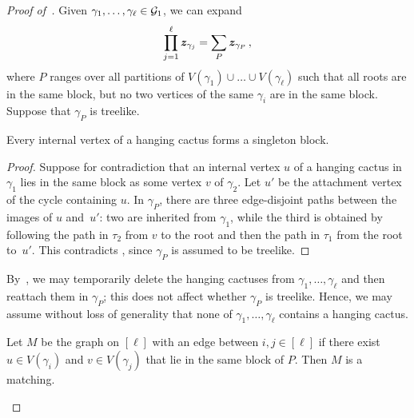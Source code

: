 \begin{proof}[Proof of~]
    Given $\gamma_1,\ldots,\gamma_\ell\in {\cal G}_1$,
    we can expand
    \[
        \prod_{j=1}^\ell {\bm z}_{\gamma_j} = \sum_P {\bm z}_{\gamma_P}\,,
    \]
    where $P$ ranges over all partitions of
    $V(\gamma_1)\cup \ldots \cup V(\gamma_\ell)$
    such that all roots are in the same block,
    but no two vertices of the same
    $\gamma_i$ are in the same block. Suppose that ${\gamma_P}$ is treelike.

    \begin{claim}\label{claim:hanging-own}
        Every internal vertex of a hanging cactus forms a singleton block.
    \end{claim}

    \begin{proof}
        Suppose for contradiction that an internal vertex $u$ of a hanging cactus in
        $\gamma_1$ lies in the same block as some vertex $v$ of $\gamma_2$. Let $u'$
        be the attachment vertex of the cycle containing $u$. In ${\gamma_P}$,
        there are three edge-disjoint paths between the images of $u$ and~$u'$: two
        are inherited from $\gamma_1$, while the third is obtained by following the
        path in $\tau_2$ from $v$ to the root and then the path in $\tau_1$ from the
        root to~$u'$. This contradicts , since ${\gamma_P}$
        is assumed to be treelike.
    \end{proof}

    By~, we may temporarily delete the hanging cactuses from
    $\gamma_1,\ldots,\gamma_\ell$ and then reattach them in ${\gamma_P}$; this
    does not affect whether ${\gamma_P}$ is treelike. Hence, we may assume
    without loss of generality that none of $\gamma_1,\ldots,\gamma_\ell$ contains a
    hanging cactus.

    \begin{claim}\label{claim:graph-is-matching}
        Let $M$ be the graph on $[\ell]$ with an edge between $i,j\in [\ell]$ if there exist
        $u\in V(\gamma_i)$ and $v\in V(\gamma_j)$ that lie in the same block of $P$.
        Then $M$ is a matching.
    \end{claim}


\end{proof}
